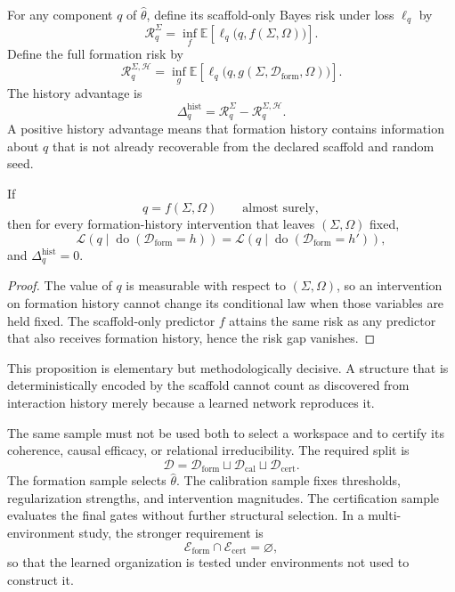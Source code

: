 For any component \(q\) of \(\widehat\theta\), define its scaffold-only Bayes
risk under loss \(\ell_q\) by
\[
\mathcal R_q^{\Sigma}
=
\inf_f
\mathbb E
\left[
\ell_q\bigl(q,f(\Sigma,\Omega)\bigr)
\right].
\]
Define the full formation risk by
\[
\mathcal R_q^{\Sigma,\mathcal H}
=
\inf_g
\mathbb E
\left[
\ell_q\bigl(q,g(\Sigma,\mathcal D_{\mathrm{form}},\Omega)\bigr)
\right].
\]
The history advantage is
\[
\boxed{
\Delta_q^{\mathrm{hist}}
=
\mathcal R_q^{\Sigma}
-
\mathcal R_q^{\Sigma,\mathcal H}.
}
\]
A positive history advantage means that formation history contains information
about \(q\) that is not already recoverable from the declared scaffold and
random seed.

\begin{SRWTproposition}\label{SRWT:prop:scaffold-only-impossibility}
If
\[
q=f(\Sigma,\Omega)
\qquad\text{almost surely},
\]
then for every formation-history intervention that leaves \((\Sigma,\Omega)\)
fixed,
\[
\mathcal L\!\left(q\mid
\operatorname{do}(\mathcal D_{\mathrm{form}}=h)
\right)
=
\mathcal L\!\left(q\mid
\operatorname{do}(\mathcal D_{\mathrm{form}}=h')
\right),
\]
and \(\Delta_q^{\mathrm{hist}}=0\).
\end{SRWTproposition}

\begin{proof}
The value of \(q\) is measurable with respect to \((\Sigma,\Omega)\), so an
intervention on formation history cannot change its conditional law when those
variables are held fixed. The scaffold-only predictor \(f\) attains the same
risk as any predictor that also receives formation history, hence the risk gap
vanishes.
\end{proof}

This proposition is elementary but methodologically decisive. A structure
that is deterministically encoded by the scaffold cannot count as discovered
from interaction history merely because a learned network reproduces it.


The same sample must not be used both to select a workspace and to certify its
coherence, causal efficacy, or relational irreducibility. The required split is
\[
\mathcal D
=
\mathcal D_{\mathrm{form}}
\sqcup
\mathcal D_{\mathrm{cal}}
\sqcup
\mathcal D_{\mathrm{cert}}.
\]
The formation sample selects \(\widehat\theta\). The calibration sample fixes
thresholds, regularization strengths, and intervention magnitudes. The
certification sample evaluates the final gates without further structural
selection. In a multi-environment study, the stronger requirement is
\[
\mathcal E_{\mathrm{form}}
\cap
\mathcal E_{\mathrm{cert}}
=
\varnothing,
\]
so that the learned organization is tested under environments not used to
construct it.

